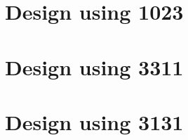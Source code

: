  \begin{center}




 \end{center}



\section{Design using 1023}


 \begin{center}




 \end{center}



\section{Design using 3311}


 \begin{center}




 \end{center}



\section{Design using 3131}


 \begin{center}




 \end{center}



